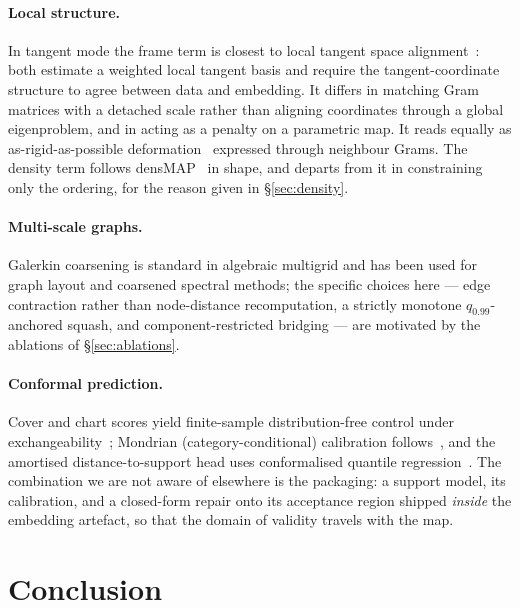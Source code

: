 \documentclass[12pt]{iopart}
\theoremstyle{definition}
\theoremstyle{plain}
\theoremstyle{remark}
\begin{document}
\paragraph{Local structure.}
In tangent mode the frame term is closest to local tangent space
alignment~\cite{zhang2004ltsa}: both estimate a weighted local tangent basis and
require the tangent-coordinate structure to agree between data and embedding.
It differs in matching Gram matrices with a detached scale rather than aligning
coordinates through a global eigenproblem, and in acting as a penalty on a
parametric map. It reads equally as as-rigid-as-possible
deformation~\cite{sorkine2007arap} expressed through neighbour Grams. The
density term follows densMAP~\cite{narayan2021densmap} in shape, and departs
from it in constraining only the ordering, for the reason given in
\S\ref{sec:density}.

\paragraph{Multi-scale graphs.}
Galerkin coarsening is standard in algebraic multigrid and has been used for
graph layout and coarsened spectral methods; the specific choices here --- edge
contraction rather than node-distance recomputation, a strictly monotone
$q_{0.99}$-anchored squash, and component-restricted bridging --- are motivated
by the ablations of \S\ref{sec:ablations}.

\paragraph{Conformal prediction.}
Cover and chart scores yield finite-sample distribution-free control under
exchangeability~\cite{vovk2005,shafer2008tutorial}; Mondrian
(category-conditional) calibration follows~\cite{vovk2003mondrian}, and the
amortised distance-to-support head uses conformalised quantile
regression~\cite{romano2019cqr}. The combination we are not aware of elsewhere
is the packaging: a support model, its calibration, and a closed-form repair
onto its acceptance region shipped \emph{inside} the embedding artefact, so
that the domain of validity travels with the map.

\section{Conclusion}
\label{sec:conclusion}
\end{document}
